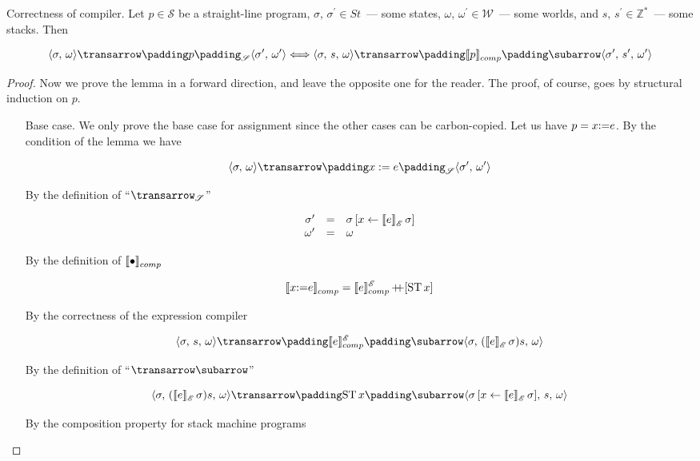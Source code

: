 \begin{lemma}{Correctness of compiler.}
  Let $p\in\mathscr{S}$ be a straight-line program, $\sigma,\,\sigma^\prime\in St$~--- some states, $\omega,\,\omega^\prime\in\mathscr{W}$~--- some worlds, and $s,\,s^\prime\in\mathbb{Z}^*$~--- some stacks.
  Then

  \[
  {\setsubarrow{_\mathscr{S}}\trans{\inbr{\sigma,\,\omega}}{p}{\inbr{\sigma^\prime,\,\omega^\prime}}}\Longleftrightarrow\trans{\inbr{\sigma,\,s,\,\omega}}{\sembr{p}^\ph_{comp}}{\inbr{\sigma^\prime,\,s^\prime,\,\omega^\prime}}
  \]
\end{lemma}
\begin{proof}
  Now we prove the lemma in a forward direction, and leave the opposite one for the reader. The proof, of course, goes by structural induction on $p$.

  \begin{itemize}
  \item[Base case.] We only prove the base case for assignment since the other cases can be carbon-copied. Let us have $p=x\llang{:=}e$. By the condition of the lemma we have

    \[
    {\setsubarrow{_{\mathscr{S}}}\trans{\inbr{\sigma,\,\omega}}{x:=e}{\inbr{\sigma^\prime,\,\omega^\prime}}}
    \]

    By the definition of ``${\setsubarrow{_{\mathscr{S}}}\transrel}$''

    \[
    \begin{array}{rcl}
      \sigma^\prime&=&\sigma\,[x\gets\sembr{e}^\ph_\mathscr{E}\,\sigma]\\
      \omega^\prime&=&\omega
    \end{array}
    \]

    By the definition of $\sembr{\bullet}^\ph_{comp}$

    \[
    \sembr{x\llang{:=}e}^\ph_{comp}=\sembr{e}^\mathscr{E}_{comp}\dplus[\llang{ST$\,x$}]
    \]

    By the correctness of the expression compiler

    \[
    \trans{\inbr{\sigma,\,s,\,\omega}}{\sembr{e}^\mathscr{E}_{comp}}{\inbr{\sigma,\,(\sembr{e}^\ph_\mathscr{E}\,\sigma)s,\,\omega}}
    \]

    By the definition of ``$\transrel$''

    \[
    \trans{\inbr{\sigma,\,(\sembr{e}^\ph_\mathscr{E}\,\sigma)s,\,\omega}}{\llang{ST$\,x$}}{\inbr{\sigma\,[x\gets\sembr{e}^\ph_\mathscr{E}\,\sigma],\,s,\,\omega}}
    \]

    By the composition property for stack machine programs


\end{itemize}
\end{proof}
